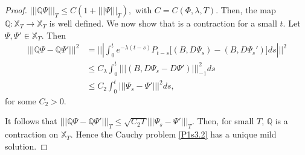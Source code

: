 \documentclass[review,onefignum,onetabnum]{siamart190516}
\begin{document}
\begin{proof}
        $
         ||| \mathbb{Q} \Psi|||_T \le C(1 + ||| \Psi|||_T),
        $
        with $C = C(\Phi, \lambda, T)$. Then, the map $\mathbb{Q}:\mathbb{X}_T
        \rightarrow \mathbb{X}_T$ is well defined. We now show that is a 
        contraction
        for a small $t$. Let $\Psi,\Psi'\in \mathbb{X}_T$. Then
        \begin{align*}
            ||| \mathbb{Q}\Psi- \mathbb{Q}\Psi'|||^2 
                &=  
                |||
                    \int_0^t e^{-\lambda (t-s)}
                        P_{t-s}
                        \big[
                            (B,D\Psi_s)-(B,D\Psi_s')
                        \big] ds 
                |||^2
                \\
                &\le  C_\lambda 
                \int_0^t 
                |||
                    (B,D\Psi_s-D\Psi') 
                |||_{-1}^2 ds \\
                &\le  C_2 
                \int_0^t 
                |||
                    \Psi_s-\Psi'
                |||^2 ds,
        \end{align*}
        for some $C_2>0$. 
    
            It follows that
        $
            ||| 
                \mathbb{Q}\Psi - \mathbb{Q}\Psi'
            |||_T  
            \le  
            \sqrt{C_2 T}
            |||
                \Psi_s - \Psi'
            |||_T.
        $
        Then, for small $T$, $\mathbb{Q}$ is a contraction on $\mathbb{X}_T$. 
        Hence the Cauchy problem \eqref{P1s3.2} has a unique mild solution.
    \end{proof}
\end{document}
